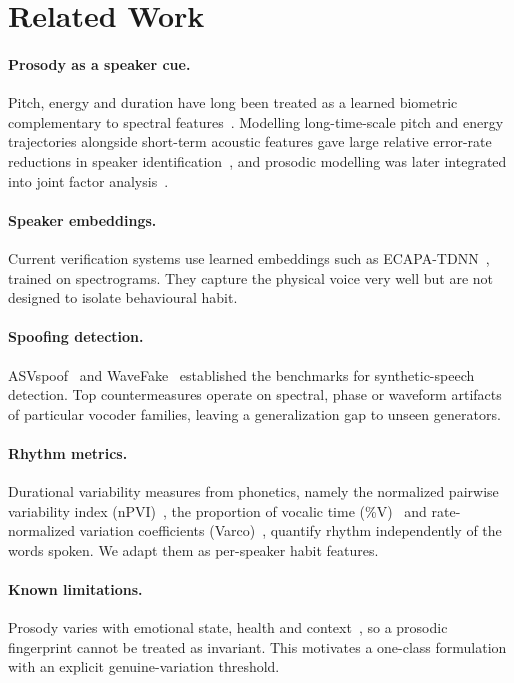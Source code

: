 \documentclass[11pt,a4paper]{article}
\begin{document}
\section{Related Work}

\paragraph{Prosody as a speaker cue.} Pitch, energy and duration have long been treated as a learned biometric complementary to spectral features~\cite{survey}. Modelling long-time-scale pitch and energy trajectories alongside short-term acoustic features gave large relative error-rate reductions in speaker identification~\cite{prosodyid}, and prosodic modelling was later integrated into joint factor analysis~\cite{dehak}.

\paragraph{Speaker embeddings.} Current verification systems use learned embeddings such as ECAPA-TDNN~\cite{ecapa}, trained on spectrograms. They capture the physical voice very well but are not designed to isolate behavioural habit.

\paragraph{Spoofing detection.} ASVspoof~\cite{asvspoof} and WaveFake~\cite{wavefake} established the benchmarks for synthetic-speech detection. Top countermeasures operate on spectral, phase or waveform artifacts of particular vocoder families, leaving a generalization gap to unseen generators.

\paragraph{Rhythm metrics.} Durational variability measures from phonetics, namely the normalized pairwise variability index (nPVI)~\cite{grabe}, the proportion of vocalic time (\%V)~\cite{ramus} and rate-normalized variation coefficients (Varco)~\cite{dellwo}, quantify rhythm independently of the words spoken. We adapt them as per-speaker habit features.

\paragraph{Known limitations.} Prosody varies with emotional state, health and context~\cite{forensic}, so a prosodic fingerprint cannot be treated as invariant. This motivates a one-class formulation with an explicit genuine-variation threshold.
\end{document}

